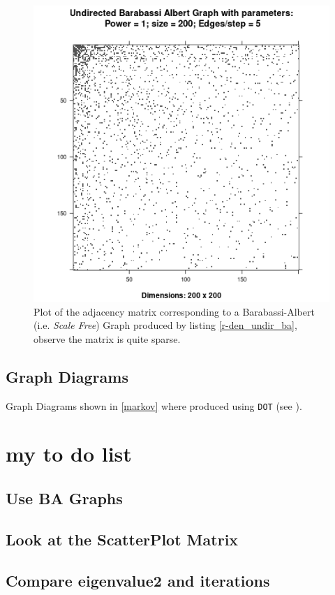 \documentclass[11pt]{article}
\begin{document}
\begin{figure}[htbp]
\centering
\includegraphics[width=12cm]{media/DensityUndirectedBA.png}
\caption{\label{fig:den_undir_ba}Plot of the adjacency matrix corresponding to a Barabassi-Albert (i.e. \emph{Scale Free}) Graph produced by listing \ref{r-den_undir_ba}, observe the matrix is quite sparse.}
\end{figure}
\subsection{Graph Diagrams}
\label{sec:org811cd11}
Graph Diagrams shown in \ref{markov} where produced using \texttt{DOT} (see \cite{DOTLanguage,DOTGraphDescription2020}).
\section{my to do list}
\label{sec:org9f5cbab}
\subsection{Use BA Graphs}
\label{sec:orga905459}
\subsection{Look at the ScatterPlot Matrix}
\label{sec:orgb50ef5e}
\subsection{Compare eigenvalue2 and iterations}
\label{sec:org932f522}
\end{document}
